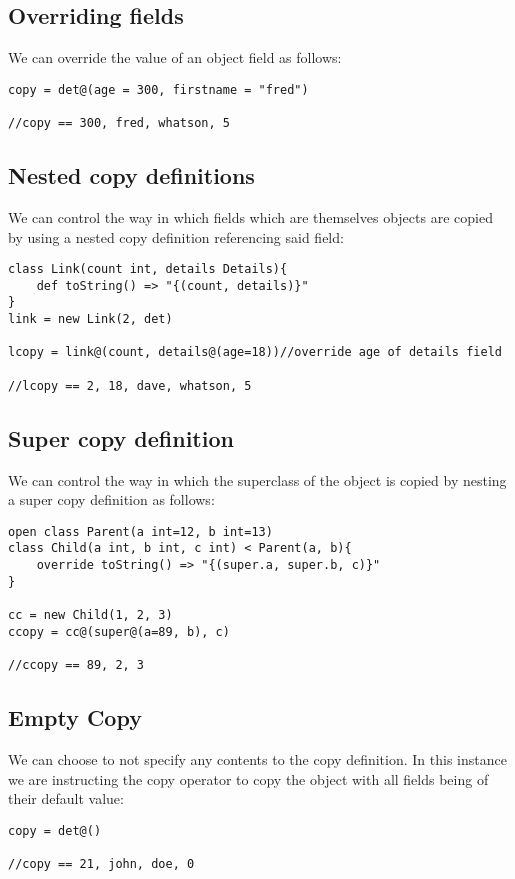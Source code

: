 \documentclass[conc-doc]{subfiles}
\begin{document}
\subsection{Overriding fields}
We can override the value of an object field as follows:
\begin{lstlisting}
copy = det@(age = 300, firstname = "fred")

//copy == 300, fred, whatson, 5
\end{lstlisting}

\subsection{Nested copy definitions}
We can control the way in which fields which are themselves objects are copied by using a nested copy definition referencing said field:
\begin{lstlisting}
class Link(count int, details Details){
	def toString() => "{(count, details)}"
}
link = new Link(2, det)

lcopy = link@(count, details@(age=18))//override age of details field

//lcopy == 2, 18, dave, whatson, 5
\end{lstlisting}

\subsection{Super copy definition}
We can control the way in which the superclass of the object is copied by nesting a super copy definition as follows:
\begin{lstlisting}
open class Parent(a int=12, b int=13)
class Child(a int, b int, c int) < Parent(a, b){
	override toString() => "{(super.a, super.b, c)}"
}

cc = new Child(1, 2, 3)
ccopy = cc@(super@(a=89, b), c)

//ccopy == 89, 2, 3
\end{lstlisting}

\subsection{Empty Copy}
We can choose to not specify any contents to the copy definition. In this instance we are instructing the copy operator to copy the object with all fields being of their default value:
\begin{lstlisting}
copy = det@()

//copy == 21, john, doe, 0
\end{lstlisting}
\end{document}
